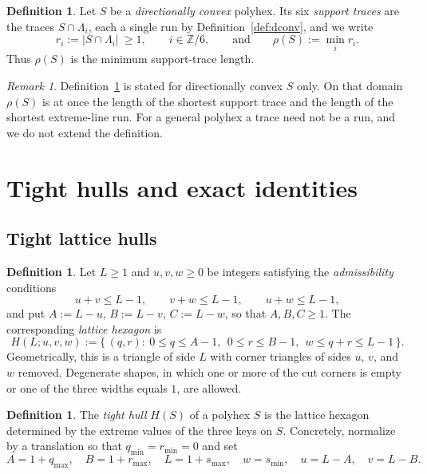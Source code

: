 \documentclass[11pt]{article}
\theoremstyle{plain}
\theoremstyle{definition}
\newtheorem{definition}[theorem]{Definition}
\theoremstyle{remark}
\newtheorem{remark}[theorem]{Remark}
\newcommand{\Z}{\mathbb{Z}}
\begin{document}
\begin{definition}\label{def:traces}
Let \(S\) be a \emph{directionally convex} polyhex. Its six \emph{support traces} are the
traces \(S\cap\Lambda_{i}\), each a single run by Definition~\ref{def:dconv}, and we write
\[
   r_{i}:=|S\cap\Lambda_{i}|\ \ge 1 ,\qquad i\in\Z/6,
   \qquad\text{and}\qquad
   \rho(S):=\min_{i} r_{i} .
\]
Thus \(\rho(S)\) is the minimum support-trace length.
\end{definition}

\begin{remark}\label{rem:rho}
Definition~\ref{def:traces} is stated for directionally convex \(S\) only. On that domain \(\rho(S)\) is at once the length of the shortest support trace and the
length of the shortest extreme-line run. For
a general polyhex a trace need not be a run, and we do not extend the definition.
\end{remark}

\section{Tight hulls and exact identities}\label{sec:hulls}

\subsection{Tight lattice hulls}\label{sec:2.4}

\begin{definition}\label{def:hexagon}
Let \(L\ge1\) and \(u,v,w\ge0\) be integers satisfying the \emph{admissibility} conditions
\begin{equation}\label{eq:adm}
   u+v\le L-1,\qquad v+w\le L-1,\qquad u+w\le L-1 ,
\end{equation}
and put \(A:=L-u\), \(B:=L-v\), \(C:=L-w\), so that \(A,B,C\ge1\). The corresponding
\emph{lattice hexagon} is
\[
   H(L;u,v,w):=\{\,(q,r):\ 0\le q\le A-1,\ \ 0\le r\le B-1,\ \ w\le q+r\le L-1\,\}.
\]
Geometrically, this is a triangle of side \(L\) with corner triangles of sides \(u\), \(v\), and
\(w\) removed. Degenerate shapes, in which one or more of the cut corners is empty or one
of the three widths equals \(1\), are allowed.
\end{definition}

\begin{definition}\label{def:hull}
The \emph{tight hull} \(H(S)\) of a polyhex \(S\) is the lattice hexagon determined by the
extreme values of the three keys on \(S\). Concretely, normalize by a translation so that
\(q_{\min}=r_{\min}=0\) and set
\[
   A=1+q_{\max},\quad B=1+r_{\max},\quad L=1+s_{\max},\quad w=s_{\min},\quad
   u=L-A,\quad v=L-B .
\]
\end{definition}
\end{document}
